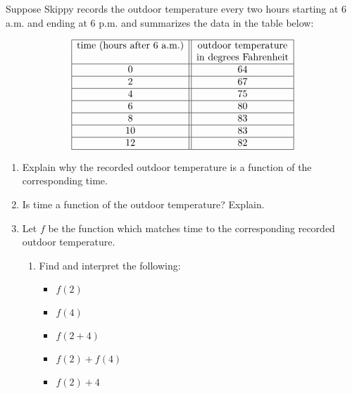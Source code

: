 \begin{ex} \label{timetempex1}   Suppose Skippy records the outdoor temperature every two hours starting at 6 a.m. and ending at 6 p.m. and summarizes the data in the table below:


\[\begin{array}{|c||c|}  \hline

  \text{time (hours after 6 a.m.)} &  \text{outdoor temperature} \\
	                               & \text{in degrees Fahrenheit} \\ \hline
 0 & 64  \\  \hline
 2 & 67  \\  \hline
 4 &  75  \\  \hline
 6 &  80 \\  \hline
 8 & 83  \\  \hline
 10 &  83 \\  \hline
 12 & 82  \\  \hline

\end{array}\]

\begin{enumerate}

\item  Explain why the recorded outdoor temperature is a function of the corresponding time. 

\item  Is time a function of the outdoor temperature?  Explain.

\item Let $f$ be the function which matches time to the corresponding recorded outdoor temperature.

\begin{enumerate}

\item  Find and interpret the following:

\begin{multicols}{3}

\begin{itemize}

\item  $f(2)$

\item  $f(4)$

\item  $f(2+4)$

\item  $f(2) + f(4)$

\item  $f(2) + 4$


\end{itemize}
\end{multicols}
\end{enumerate}
\end{enumerate}
\end{ex}
